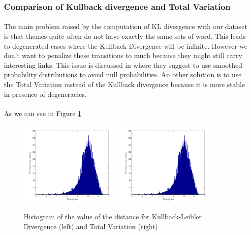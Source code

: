 \subsubsection{Comparison of Kullback divergence and Total Variation}

\paragraph{}
The main problem raised by the computation of KL divergence with our dataset is that themes quite often do not have exactly the same sets of word. This leads to degenerated cases where the Kullback Divergence will be infinite. However we don't want to penalize these transitions to much because they might still carry interesting links. This issue is discussed in \cite{de2010grammatical} where they suggest to use smoothed probability distributions to avoid null probabilities. An other solution is to use the Total Variation instead of the Kullback divergence because it is more stable in presence of degeneracies.

\paragraph{}
As we can see in Figure \ref{fig:divergence} 
\begin{figure}[H]
\begin{center}
	\label{fig:divergence}
	\includegraphics[width=0.45\textwidth]{images/divergence}
	\includegraphics[width=0.45\textwidth]{images/divergence}
	\caption{Histogram of the value of the distance for Kullback-Leibler Divergence (left) and Total Variation (right)}
\end{center}
\end{figure}

